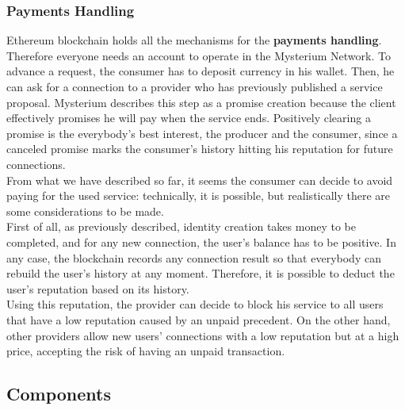\documentclass[12pt]{article}
\begin{document}
	\subsubsection{Payments Handling}

	Ethereum blockchain holds all the mechanisms for the \textbf{payments handling}. Therefore everyone needs an account to operate in the Mysterium Network. To advance a request, the consumer has to deposit currency in his wallet. Then, he can ask for a connection to a provider who has previously published a service proposal. Mysterium describes this step as a promise creation because the client effectively promises he will pay when the service ends. Positively clearing a promise is the everybody's best interest, the producer and the consumer, since a canceled promise marks the consumer's history hitting his reputation for future connections.\\
	From what we have described so far, it seems the consumer can decide to avoid paying for the used service: technically, it is possible, but realistically there are some considerations to be made.\\
	First of all, as previously described, identity creation takes money to be completed, and for any new connection, the user's balance has to be positive. In any case, the blockchain records any connection result so that everybody can rebuild the user's history at any moment. Therefore, it is possible to deduct the user's reputation based on its history.\\
	Using this reputation, the provider can decide to block his service to all users that have a low reputation caused by an unpaid precedent. On the other hand, other providers allow new users' connections with a low reputation but at a high price, accepting the risk of having an unpaid transaction.\\
	
	\subsection{Components}
\end{document}
